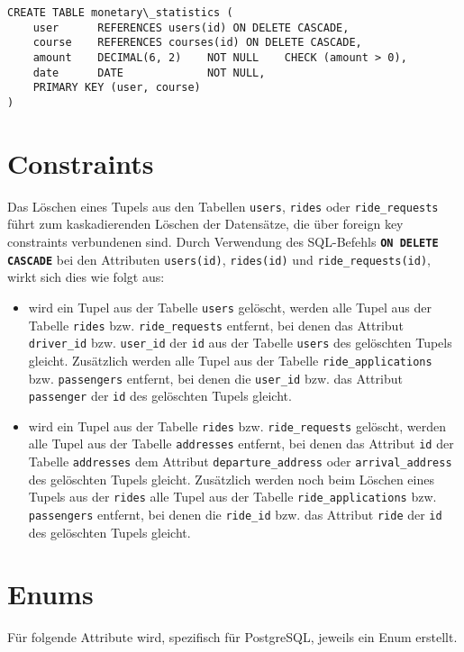 \begin{verbatim}
CREATE TABLE monetary\_statistics (
    user      REFERENCES users(id) ON DELETE CASCADE,
    course    REFERENCES courses(id) ON DELETE CASCADE,
    amount    DECIMAL(6, 2)    NOT NULL    CHECK (amount > 0),
    date      DATE             NOT NULL,
    PRIMARY KEY (user, course)
)
\end{verbatim}

\section{Constraints}
Das Löschen eines Tupels aus den Tabellen \texttt{users}, \texttt{rides} oder \texttt{ride\_requests} führt zum kaskadierenden Löschen der Datensätze, die über foreign key constraints verbundenen sind. Durch Verwendung des SQL-Befehls \texttt{\textbf{ON DELETE CASCADE}} bei den Attributen \texttt{users(id)}, \texttt{rides(id)} und \texttt{ride\_requests(id)}, wirkt sich dies wie folgt aus:
\begin{itemize}
\item wird ein Tupel aus der Tabelle \texttt{users} gelöscht, werden alle Tupel aus der Tabelle \texttt{rides} bzw. \texttt{ride\_requests} entfernt, bei denen das Attribut \texttt{driver\_id} bzw. \texttt{user\_id} der \texttt{id} aus der Tabelle \texttt{users} des gelöschten Tupels gleicht. Zusätzlich werden alle Tupel aus der Tabelle \texttt{ride\_applications} bzw. \texttt{passengers} entfernt, bei denen die \texttt{user\_id} bzw. das Attribut \texttt{passenger} der \texttt{id} des gelöschten Tupels gleicht.
\item wird ein Tupel aus der Tabelle \texttt{rides} bzw. \texttt{ride\_requests} gelöscht, werden alle Tupel aus der Tabelle \texttt{addresses} entfernt, bei denen das Attribut \texttt{id} der Tabelle \texttt{addresses} dem Attribut \texttt{departure\_address} oder \texttt{arrival\_address} des gelöschten Tupels gleicht. Zusätzlich werden noch beim Löschen eines Tupels aus der \texttt{rides} alle Tupel aus der Tabelle \texttt{ride\_applications} bzw. \texttt{passengers} entfernt, bei denen die \texttt{ride\_id} bzw. das Attribut \texttt{ride} der \texttt{id} des gelöschten Tupels gleicht.
\end{itemize}

\section{Enums}
Für folgende Attribute wird, spezifisch für PostgreSQL, jeweils ein Enum erstellt.

